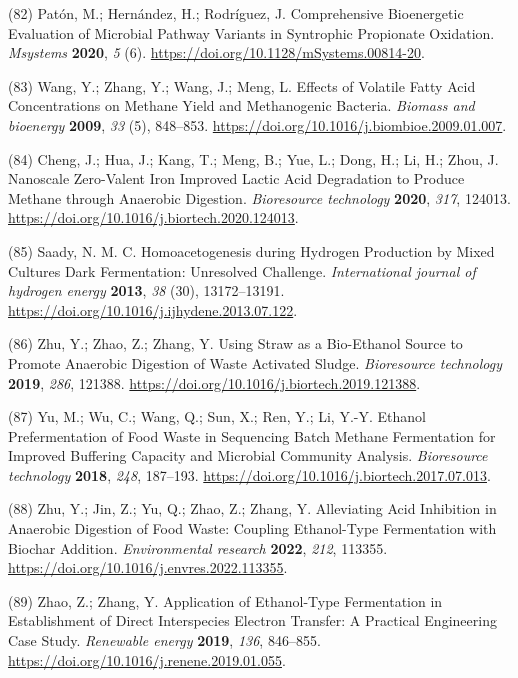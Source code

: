 \documentclass[11pt]{report}
\begin{document}
\hypertarget{citeproc_bib_item_82}{(82) Patón, M.; Hernández, H.; Rodríguez, J. Comprehensive Bioenergetic Evaluation of Microbial Pathway Variants in Syntrophic Propionate Oxidation. \textit{Msystems} \textbf{2020}, \textit{5} (6). \url{https://doi.org/10.1128/mSystems.00814-20}.}

\hypertarget{citeproc_bib_item_83}{(83) Wang, Y.; Zhang, Y.; Wang, J.; Meng, L. Effects of Volatile Fatty Acid Concentrations on Methane Yield and Methanogenic Bacteria. \textit{Biomass and bioenergy} \textbf{2009}, \textit{33} (5), 848–853. \url{https://doi.org/10.1016/j.biombioe.2009.01.007}.}

\hypertarget{citeproc_bib_item_84}{(84) Cheng, J.; Hua, J.; Kang, T.; Meng, B.; Yue, L.; Dong, H.; Li, H.; Zhou, J. Nanoscale Zero-Valent Iron Improved Lactic Acid Degradation to Produce Methane through Anaerobic Digestion. \textit{Bioresource technology} \textbf{2020}, \textit{317}, 124013. \url{https://doi.org/10.1016/j.biortech.2020.124013}.}

\hypertarget{citeproc_bib_item_85}{(85) Saady, N. M. C. Homoacetogenesis during Hydrogen Production by Mixed Cultures Dark Fermentation: Unresolved Challenge. \textit{International journal of hydrogen energy} \textbf{2013}, \textit{38} (30), 13172–13191. \url{https://doi.org/10.1016/j.ijhydene.2013.07.122}.}

\hypertarget{citeproc_bib_item_86}{(86) Zhu, Y.; Zhao, Z.; Zhang, Y. Using Straw as a Bio-Ethanol Source to Promote Anaerobic Digestion of Waste Activated Sludge. \textit{Bioresource technology} \textbf{2019}, \textit{286}, 121388. \url{https://doi.org/10.1016/j.biortech.2019.121388}.}

\hypertarget{citeproc_bib_item_87}{(87) Yu, M.; Wu, C.; Wang, Q.; Sun, X.; Ren, Y.; Li, Y.-Y. Ethanol Prefermentation of Food Waste in Sequencing Batch Methane Fermentation for Improved Buffering Capacity and Microbial Community Analysis. \textit{Bioresource technology} \textbf{2018}, \textit{248}, 187–193. \url{https://doi.org/10.1016/j.biortech.2017.07.013}.}

\hypertarget{citeproc_bib_item_88}{(88) Zhu, Y.; Jin, Z.; Yu, Q.; Zhao, Z.; Zhang, Y. Alleviating Acid Inhibition in Anaerobic Digestion of Food Waste: Coupling Ethanol-Type Fermentation with Biochar Addition. \textit{Environmental research} \textbf{2022}, \textit{212}, 113355. \url{https://doi.org/10.1016/j.envres.2022.113355}.}

\hypertarget{citeproc_bib_item_89}{(89) Zhao, Z.; Zhang, Y. Application of Ethanol-Type Fermentation in Establishment of Direct Interspecies Electron Transfer: A Practical Engineering Case Study. \textit{Renewable energy} \textbf{2019}, \textit{136}, 846–855. \url{https://doi.org/10.1016/j.renene.2019.01.055}.}
\end{document}
